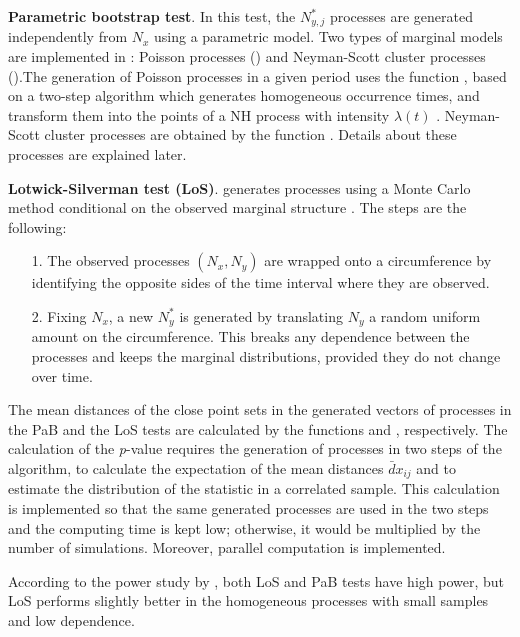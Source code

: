 \textbf{Parametric bootstrap test}.  In this test, the  $N_{y,j}^*$ processes  are generated  independently from   $N_x$  using   a parametric model. Two types of marginal  models are implemented in : Poisson processes ()   and   Neyman-Scott cluster processes  ().The generation of Poisson processes  in a given period uses the function , based on a two-step algorithm which   generates homogeneous occurrence times, and transform them into 
the points  of a  NH process with intensity $\lambda(t)$ \citep{Ross06}.
Neyman-Scott cluster processes  are obtained by the function . Details about these processes  are explained later.


\textbf{Lotwick-Silverman test (LoS)}.    generates  processes    using   a Monte Carlo method conditional on the observed marginal structure \citep{Lotwick82}. 
The  steps   are the following:
\begin{itemize}
	
	\item[1.]  The  observed  processes $(N_x, N_y)$ are wrapped onto a circumference by identifying the  opposite sides of the time interval where they are observed.
	\item[2.] Fixing $N_x$, a new $N^*_y$ is generated by translating $N_y$  a random   uniform amount  on the circumference. This breaks any dependence between the processes and  keeps the marginal distributions, provided they do not change over time.
\end{itemize}



The mean distances  of the close point sets in  the generated vectors of processes in the PaB and the LoS tests  are calculated by the functions   and ,  respectively.
The  calculation of the \emph{p}-value requires the generation of processes in two steps of the algorithm, to  calculate the   expectation of the mean   distances $\bar dx_{ij}$  and  to estimate  the distribution of the  statistic  in a correlated sample. This calculation is implemented  so that the  same  generated processes  are  used in the two steps and the computing time  is kept low; otherwise,  it would be multiplied by the number of  simulations. Moreover, parallel computation is implemented.


According to the power study by \citet{Cebrian20},  both LoS and PaB tests  have high power, but  LoS   performs slightly  better in the homogeneous processes with small samples and low dependence.





